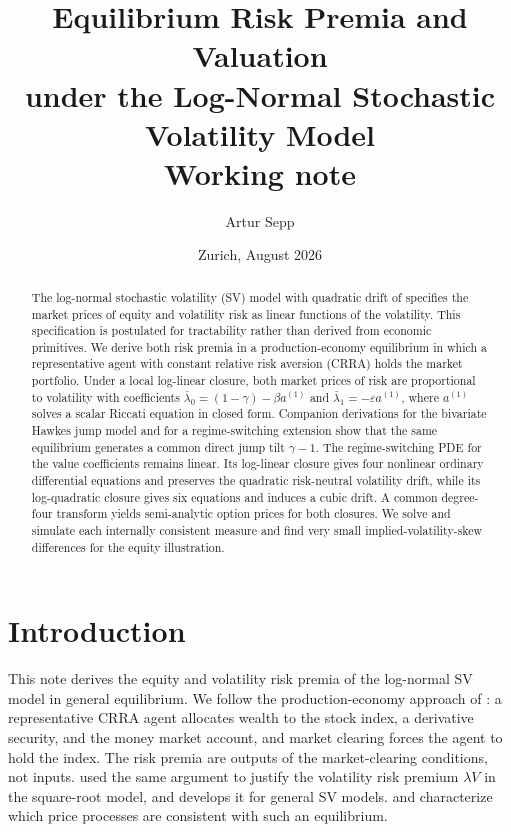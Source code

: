 \documentclass[11pt]{article}
\title{Equilibrium Risk Premia and Valuation\\ under the Log-Normal Stochastic Volatility Model\\[1ex] \large Working note}
\author{Artur Sepp}
\date{Zurich, August 2026}
\theoremstyle{remark}
\begin{document}
\maketitle

\begin{abstract}
\sloppy
\noindent
The log-normal stochastic volatility (SV) model with quadratic drift of \cite{SeppRakhmonov2024} specifies the market prices of equity and volatility risk as linear functions of the volatility. This specification is postulated for tractability rather than derived from economic primitives. We derive both risk premia in a production-economy equilibrium in which a representative agent with constant relative risk aversion (CRRA) holds the market portfolio. Under a local log-linear closure, both market prices of risk are proportional to volatility with coefficients $\bar\lambda_{0}=(1-\gamma)-\beta a^{(1)}$ and $\bar\lambda_{1}=-\varepsilon a^{(1)}$, where $a^{(1)}$ solves a scalar Riccati equation in closed form. Companion derivations for the bivariate Hawkes jump model and for a regime-switching extension show that the same equilibrium generates a common direct jump tilt $\gamma-1$. The regime-switching PDE for the value coefficients remains linear. Its log-linear closure gives four nonlinear ordinary differential equations and preserves the quadratic risk-neutral volatility drift, while its log-quadratic closure gives six equations and induces a cubic drift. A common degree-four transform yields semi-analytic option prices for both closures. We solve and simulate each internally consistent measure and find very small implied-volatility-skew differences for the equity illustration.
\end{abstract}

\section{Introduction}\label{sec:intro}

This note derives the equity and volatility risk premia of the log-normal SV model in general equilibrium. We follow the production-economy approach of \cite{CIR1985}: a representative CRRA agent allocates wealth to the stock index, a derivative security, and the money market account, and market clearing forces the agent to hold the index. The risk premia are outputs of the market-clearing conditions, not inputs. \cite{Heston1993} used the same argument to justify the volatility risk premium $\lambda V$ in the square-root model, and \cite{Lewis2000} develops it for general SV models. \cite{Bick1990} and \cite{HeLeland1993} characterize which price processes are consistent with such an equilibrium.
\end{document}

